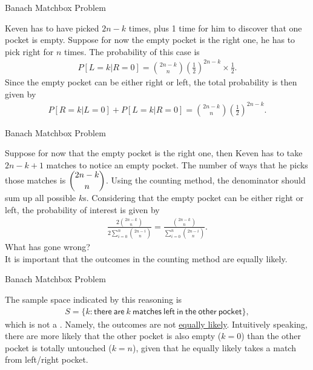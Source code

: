 \begin{frame}{Banach Matchbox Problem}

\justifying
{} Keven has to have picked $2n-k$ times, plus 1 time for him to discover that one pocket is empty. Suppose for now the empty pocket is the right one, he has to pick right for $n$ times. The probability of this case is
\begin{align*}
P[L = k|R = 0] = \binom{2n-k}{n}\left(\frac{1}{2} \right)^{2n-k} \times \frac{1}{2}.
\end{align*}
Since the empty pocket can be either right or left, the total probability is then given by
\begin{align*}
P[R = k|L = 0] + P[L = k|R = 0] = \binom{2n-k}{n}\left(\frac{1}{2} \right)^{2n-k}.
\end{align*}


\end{frame}

\begin{frame}{Banach Matchbox Problem}

\justifying
{} Suppose for now that the empty pocket is the right one, then Keven has to take $2n-k+1$ matches to notice an empty pocket. The number of ways that he picks those matches is $\dbinom{2n-k}{n}$. Using the counting method, the denominator should sum up all possible $k$s. Considering that the empty pocket can be either right or left, the probability of interest is given by
\begin{align*}
\frac{2\binom{2n-k}{n}}{2\sum_{i=0}^n\binom{2n-i}{n}} = \frac{\binom{2n-k}{n}}{\sum_{i=0}^n \binom{2n-i}{n}}.
\end{align*}
What has gone wrong?
\pause
~\\
 It is important that the outcomes in the counting method are equally likely.

\end{frame}

\begin{frame}{Banach Matchbox Problem}

\justifying
{} The sample space indicated by this reasoning is 
\begin{align*}
S = \{k: \mathsf{there\ are\ } k \mathsf{\ matches\ left\ in\ the\ other\ pocket} \},
\end{align*}
which is not a . Namely, the outcomes are not \underline{equally likely}. Intuitively speaking, there are more likely that the other pocket is also empty ($k=0$) than the other pocket is totally untouched ($k=n$), given that he equally likely takes a match from left/right pocket.

\end{frame}

